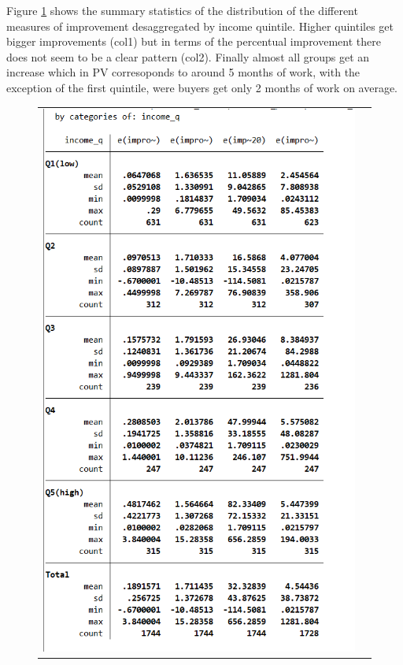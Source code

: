 \documentclass[12pt]{article}
\begin{document}
Figure \ref{fig:aux2} shows the summary statistics of the distribution of the different measures of improvement desaggregated by income quintile. Higher quintiles get bigger improvements (col1) but in terms of the percentual improvement there does not seem to be a clear pattern (col2). Finally almost all groups get an increase which in PV corresoponds to around 5 months of work, with the exception of the first quintile, were buyers get only 2 months of work on average. 
\begin{figure}[H]
\caption{}
\label{fig:aux2}
\centering{}%
\begin{tabular}{cc}
\includegraphics[scale=0.7]{Tables/IE3_offer_improvement_byincomequintile.png}
\end{tabular}
\end{figure}
\end{document}
